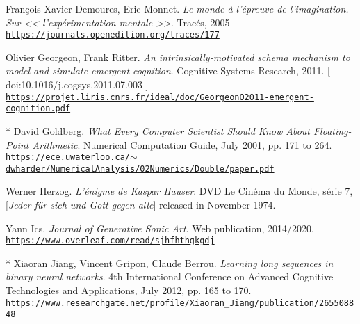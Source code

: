 \begin{thebibliography}{99}
	 François-Xavier Demoures, Eric Monnet. \textit{Le monde à l’épreuve de l’imagination. Sur << l’expérimentation mentale >>}. Tracés, 2005 \\ \href{https://journals.openedition.org/traces/177}{\scriptsize{\texttt{https://journals.openedition.org/traces/177}}} \normalsize{}
	 
	 Olivier Georgeon, Frank Ritter. \textit{An intrinsically-motivated schema mechanism to model and simulate emergent cognition}. 
	 Cognitive Systems Research, 2011. {\scriptsize [ doi:10.1016/j.cogsys.2011.07.003 ]}
	 \\ \href{https://projet.liris.cnrs.fr/ideal/doc/GeorgeonO2011-emergent-cognition.pdf}{\scriptsize{\texttt{https://projet.liris.cnrs.fr/ideal/doc/GeorgeonO2011-emergent-cognition.pdf}}} \normalsize{}
	 
	 * David Goldberg. \textit{What Every Computer Scientist Should Know About Floating-Point Arithmetic}. Numerical Computation Guide, July 2001, pp. 171 to 264.\\ \href{https://ece.uwaterloo.ca/\~dwharder/NumericalAnalysis/02Numerics/Double/paper.pdf}{\scriptsize{\texttt{https://ece.uwaterloo.ca/$\sim$dwharder/NumericalAnalysis/02Numerics/Double/paper.pdf}}} \normalsize{}
	 
	 Werner Herzog. \textit{L'énigme de Kaspar Hauser}. DVD Le Cinéma du Monde, série 7, [\textit{Jeder für sich und Gott gegen alle}] released in November 1974.
	 
	 Yann Ics. \textit{Journal of Generative Sonic Art}. Web publication, 2014/2020.\\ \href{https://www.overleaf.com/read/sjhfhthgkgdj}{\scriptsize{\texttt{https://www.overleaf.com/read/sjhfhthgkgdj}}} \normalsize{}
	
	 * Xiaoran Jiang, Vincent Gripon, Claude Berrou. \textit{Learning long sequences in binary neural networks}. 4th International Conference on Advanced Cognitive Technologies and Applications, July 2012, pp. 165 to 170.\\ \href{https://www.researchgate.net/profile/Xiaoran\_Jiang/publication/265508848\_Learning\_Long\_Sequences\_in\_Binary\_Neural\_Networks/links/54107a6c0cf2f2b29a410d8c.pdf}{\scriptsize{\texttt{https://www.researchgate.net/profile/Xiaoran\_Jiang/publication/265508848}}} \normalsize{}
	 

\end{thebibliography}
